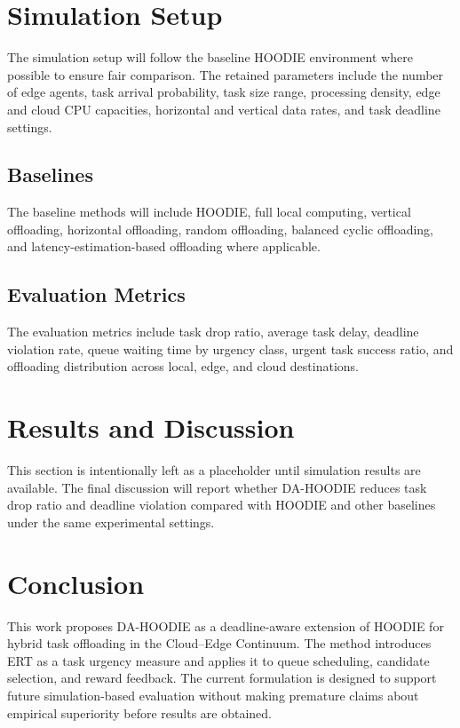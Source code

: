 \documentclass{article}
\begin{document}
\section{Simulation Setup}
\label{sec:simulation_setup}

The simulation setup will follow the baseline HOODIE environment where possible to ensure fair comparison. The retained parameters include the number of edge agents, task arrival probability, task size range, processing density, edge and cloud CPU capacities, horizontal and vertical data rates, and task deadline settings.

\subsection{Baselines}
\label{subsec:baselines}

The baseline methods will include HOODIE, full local computing, vertical offloading, horizontal offloading, random offloading, balanced cyclic offloading, and latency-estimation-based offloading where applicable.

\subsection{Evaluation Metrics}
\label{subsec:evaluation_metrics}

The evaluation metrics include task drop ratio, average task delay, deadline violation rate, queue waiting time by urgency class, urgent task success ratio, and offloading distribution across local, edge, and cloud destinations.

\section{Results and Discussion}
\label{sec:results_discussion}

This section is intentionally left as a placeholder until simulation results are available. The final discussion will report whether DA-HOODIE reduces task drop ratio and deadline violation compared with HOODIE and other baselines under the same experimental settings.

\section{Conclusion}
\label{sec:conclusion}

This work proposes DA-HOODIE as a deadline-aware extension of HOODIE for hybrid task offloading in the Cloud--Edge Continuum. The method introduces ERT as a task urgency measure and applies it to queue scheduling, candidate selection, and reward feedback. The current formulation is designed to support future simulation-based evaluation without making premature claims about empirical superiority before results are obtained.
\end{document}
